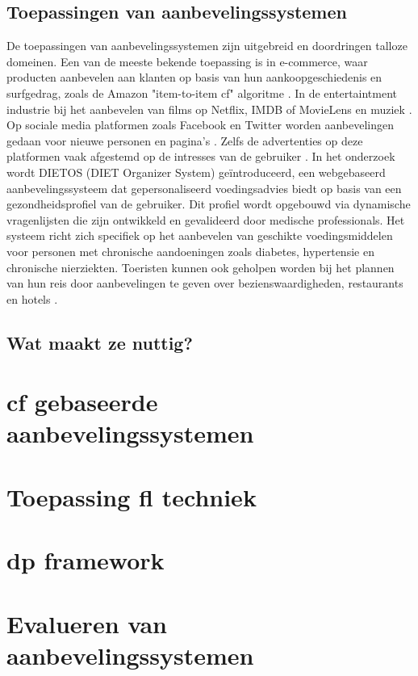 \subsection{Toepassingen van aanbevelingssystemen}
De toepassingen van aanbevelingssystemen zijn uitgebreid en doordringen talloze domeinen. Een van de meeste bekende toepassing is in e-commerce, waar producten aanbevelen aan klanten op basis van hun aankoopgeschiedenis en surfgedrag, zoals de Amazon "item-to-item \ac{cf}" algoritme \autocite{Patel2023, Patel2020}.
In de entertaintment industrie bij het aanbevelen van films op Netflix, IMDB of MovieLens en muziek \autocite{Patel2020, Roy2022}. Op sociale media platformen zoals Facebook en Twitter worden aanbevelingen gedaan voor nieuwe personen en pagina's \autocite{Patel2023}. Zelfs de advertenties op deze platformen vaak afgestemd op de intresses van de gebruiker \autocite{Patel2020}.
In het onderzoek \textcite{Agapito2016} wordt DIETOS (DIET Organizer System) geïntroduceerd, een webgebaseerd aanbevelingssysteem dat gepersonaliseerd voedingsadvies biedt op basis van een gezondheidsprofiel van de gebruiker. Dit profiel wordt opgebouwd via dynamische vragenlijsten die zijn ontwikkeld en gevalideerd door medische professionals. Het systeem richt zich specifiek op het aanbevelen van geschikte voedingsmiddelen voor personen met chronische aandoeningen zoals diabetes, hypertensie en chronische nierziekten. Toeristen kunnen ook geholpen worden bij het plannen van hun reis door aanbevelingen te geven over bezienswaardigheden, restaurants en hotels \autocite{Roy2022, Patel2023}.
\subsection{Wat maakt ze nuttig?}
\section{\ac{cf} gebaseerde aanbevelingssystemen}
\section{Toepassing \ac{fl} techniek}
\section{\ac{dp} framework}
\section{Evalueren van aanbevelingssystemen}

